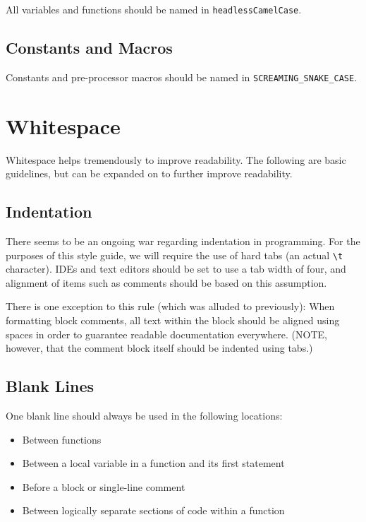 \documentclass[11pt]{book}
\begin{document}
All variables and functions should be named in
\texttt{headlessCamelCase}.

\subsection{Constants and Macros}\label{constants-and-macros}

Constants and pre-processor macros should be named in
\texttt{SCREAMING\_SNAKE\_CASE}.

\section{Whitespace}\label{whitespace}

Whitespace helps tremendously to improve readability. The following are
basic guidelines, but can be expanded on to further improve readability.

\subsection{Indentation}\label{indentation}

There seems to be an ongoing war regarding indentation in programming.
For the purposes of this style guide, we will require the use of hard
tabs (an actual \texttt{\textbackslash{}t} character). IDEs and text
editors should be set to use a tab width of four, and alignment of items
such as comments should be based on this assumption.

There is one exception to this rule (which was alluded to previously):
When formatting block comments, all text within the block should be
aligned using spaces in order to guarantee readable documentation
everywhere. (NOTE, however, that the comment block itself should be
indented using tabs.)

\subsection{Blank Lines}\label{blank-lines}

One blank line should always be used in the following locations:

\begin{itemize}
\item
  Between functions
\item
  Between a local variable in a function and its first statement
\item
  Before a block or single-line comment
\item
  Between logically separate sections of code within a function
\end{itemize}
\end{document}
